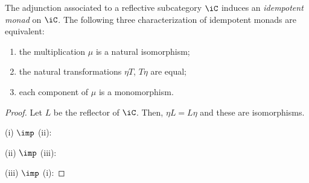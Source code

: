 \documentclass{amsart}
\begin{document}
\begin{lem}
  The adjunction associated to a reflective subcategory $\iC$ induces an \emph{idempotent monad} on $\iC$.
  The following three characterization of idempotent monads are equivalent:
  \begin{enumerate}
  \item the multiplication $\mu$ is a natural isomorphism;
  \item the natural transformations $\eta T$, $T\eta$ are equal;
  \item each component of $\mu$ is a monomorphism.
  \end{enumerate}
\end{lem}
\begin{proof}
  Let $L$ be the reflector of $\iC$.
  Then, $\eta L = L\eta$ and these are isomorphisms.

  (i) $\imp$ (ii): 

  (ii) $\imp$ (iii):

  (iii) $\imp$ (i):
\end{proof}



\end{document}
